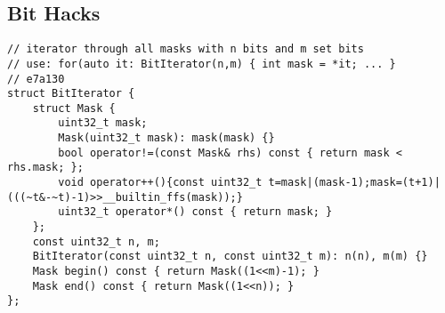 \documentclass{article}
\begin{document}
\subsection{Bit Hacks}
\begin{verbatim}
// iterator through all masks with n bits and m set bits
// use: for(auto it: BitIterator(n,m) { int mask = *it; ... }
// e7a130
struct BitIterator {
	struct Mask {
		uint32_t mask;
		Mask(uint32_t mask): mask(mask) {}
		bool operator!=(const Mask& rhs) const { return mask < rhs.mask; };
		void operator++(){const uint32_t t=mask|(mask-1);mask=(t+1)|(((~t&-~t)-1)>>__builtin_ffs(mask));}
		uint32_t operator*() const { return mask; }
	};
	const uint32_t n, m;
	BitIterator(const uint32_t n, const uint32_t m): n(n), m(m) {}
	Mask begin() const { return Mask((1<<m)-1); }
	Mask end() const { return Mask((1<<n)); }
};
\end{verbatim}
\end{document}
